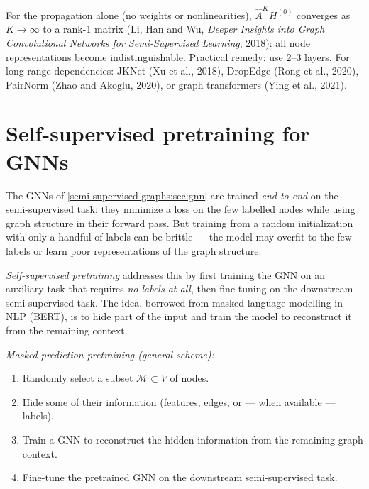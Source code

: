 \begin{notechapter}
\begin{pitfall}
For the propagation alone (no weights or nonlinearities), $\hat{A}^K H^{(0)}$ converges as $K \to \infty$ to a rank-1
matrix (Li, Han and Wu, \emph{Deeper Insights into Graph Convolutional Networks for Semi-Supervised Learning}, 2018): all node representations become indistinguishable.
Practical remedy: use 2--3 layers. For long-range dependencies:
JKNet (Xu et al., 2018), DropEdge (Rong et al., 2020),
PairNorm (Zhao and Akoglu, 2020), or graph transformers (Ying et al., 2021).
\end{pitfall}


\section{Self-supervised pretraining for GNNs}
\label{semi-supervised-graphs:sec:mlp}

The GNNs of \cref{semi-supervised-graphs:sec:gnn} are trained \emph{end-to-end} on the
semi-supervised task: they minimize a loss on the few labelled nodes while using
graph structure in their forward pass. But training from a random initialization
with only a handful of labels can be brittle --- the model may overfit to the few
labels or learn poor representations of the graph structure.

\emph{Self-supervised pretraining} addresses this by first training the GNN
on an auxiliary task that requires \emph{no labels at all}, then fine-tuning
on the downstream semi-supervised task. The idea, borrowed from masked language
modelling in NLP (BERT), is to hide part of the input and train the model to
reconstruct it from the remaining context.

\begin{keyidea}
\emph{Masked prediction pretraining (general scheme):}
\begin{enumerate}
    \item Randomly select a subset $\mathcal{M} \subset V$ of nodes.
    \item Hide some of their information (features, edges, or --- when
          available --- labels).
    \item Train a GNN to reconstruct the hidden information from the
          remaining graph context.
    \item Fine-tune the pretrained GNN on the downstream semi-supervised task.
\end{enumerate}
\end{keyidea}


\end{notechapter}
